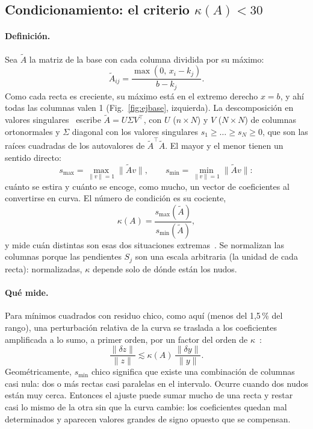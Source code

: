 \subsection{Condicionamiento: el criterio $\kappa(A)<30$}
\paragraph{Definición.} Sea $\tilde A$ la matriz de la base con cada columna dividida por su máximo:
\[
\tilde A_{ij}=\frac{\max(0,\,x_i-k_j)}{b-k_j}.
\]
Como cada recta es creciente, su máximo está en el extremo derecho $x=b$, y ahí todas las columnas valen 1 (Fig.~\ref{fig:ejbase}, izquierda). La descomposición en valores singulares~\cite{golub} escribe $\tilde A=U\Sigma V^{\top}$, con $U$ ($n\times N$) y $V$ ($N\times N$) de columnas ortonormales y $\Sigma$ diagonal con los valores singulares $s_1\ge\dots\ge s_N\ge0$, que son las raíces cuadradas de los autovalores de $\tilde A^{\top}\tilde A$. El mayor y el menor tienen un sentido directo:
\[
s_{\max}=\max_{\lVert v\rVert=1}\lVert\tilde Av\rVert,\qquad s_{\min}=\min_{\lVert v\rVert=1}\lVert\tilde Av\rVert:
\]
cuánto se estira y cuánto se encoge, como mucho, un vector de coeficientes al convertirse en curva. El número de condición es su cociente,
\begin{equation}\label{eq:kappa}
\kappa(A)=\frac{s_{\max}(\tilde A)}{s_{\min}(\tilde A)},
\end{equation}
y mide cuán distintas son esas dos situaciones extremas~\cite{trefethen}. Se normalizan las columnas porque las pendientes $S_j$ son una escala arbitraria (la unidad de cada recta): normalizadas, $\kappa$ depende solo de dónde están los nudos.

\paragraph{Qué mide.} Para mínimos cuadrados con residuo chico, como aquí (menos del 1,5\,\% del rango), una perturbación relativa de la curva se traslada a los coeficientes amplificada a lo sumo, a primer orden, por un factor del orden de $\kappa$~\cite{golub}:
\[
\frac{\lVert\delta z\rVert}{\lVert z\rVert}\lesssim\kappa(A)\,\frac{\lVert\delta y\rVert}{\lVert y\rVert}.
\]
Geométricamente, $s_{\min}$ chico significa que existe una combinación de columnas casi nula: dos o más rectas casi paralelas en el intervalo. Ocurre cuando dos nudos están muy cerca. Entonces el ajuste puede sumar mucho de una recta y restar casi lo mismo de la otra sin que la curva cambie: los coeficientes quedan mal determinados y aparecen valores grandes de signo opuesto que se compensan.

